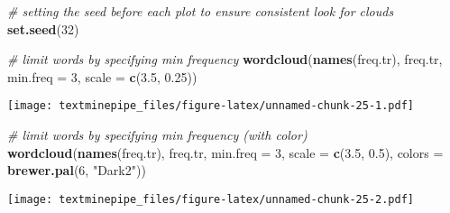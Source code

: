 \documentclass[
]{article}
\newenvironment{Shaded}{\begin{snugshade}}{\end{snugshade}}
\newcommand{\CommentTok}[1]{\textcolor[rgb]{0.56,0.35,0.01}{\textit{#1}}}
\newcommand{\DataTypeTok}[1]{\textcolor[rgb]{0.13,0.29,0.53}{#1}}
\newcommand{\DecValTok}[1]{\textcolor[rgb]{0.00,0.00,0.81}{#1}}
\newcommand{\FloatTok}[1]{\textcolor[rgb]{0.00,0.00,0.81}{#1}}
\newcommand{\KeywordTok}[1]{\textcolor[rgb]{0.13,0.29,0.53}{\textbf{#1}}}
\newcommand{\NormalTok}[1]{#1}
\newcommand{\StringTok}[1]{\textcolor[rgb]{0.31,0.60,0.02}{#1}}
\begin{document}
\begin{Shaded}
\begin{Highlighting}[]
\CommentTok{# setting the seed before each plot to ensure consistent look for clouds}
\KeywordTok{set.seed}\NormalTok{(}\DecValTok{32}\NormalTok{)}

\CommentTok{# limit words by specifying min frequency}
\KeywordTok{wordcloud}\NormalTok{(}\KeywordTok{names}\NormalTok{(freq.tr), freq.tr, }\DataTypeTok{min.freq =} \DecValTok{3}\NormalTok{, }\DataTypeTok{scale =} \KeywordTok{c}\NormalTok{(}\FloatTok{3.5}\NormalTok{, }\FloatTok{0.25}\NormalTok{))}
\end{Highlighting}
\end{Shaded}

\texttt{[image: textminepipe\_files/figure-latex/unnamed-chunk-25-1.pdf]}

\begin{Shaded}
\begin{Highlighting}[]
\CommentTok{# limit words by specifying min frequency (with color)}
\KeywordTok{wordcloud}\NormalTok{(}\KeywordTok{names}\NormalTok{(freq.tr), freq.tr, }\DataTypeTok{min.freq =} \DecValTok{3}\NormalTok{, }\DataTypeTok{scale =} \KeywordTok{c}\NormalTok{(}\FloatTok{3.5}\NormalTok{, }\FloatTok{0.5}\NormalTok{), }\DataTypeTok{colors =} \KeywordTok{brewer.pal}\NormalTok{(}\DecValTok{6}\NormalTok{, }\StringTok{"Dark2"}\NormalTok{))}
\end{Highlighting}
\end{Shaded}

\texttt{[image: textminepipe\_files/figure-latex/unnamed-chunk-25-2.pdf]}
\end{document}
